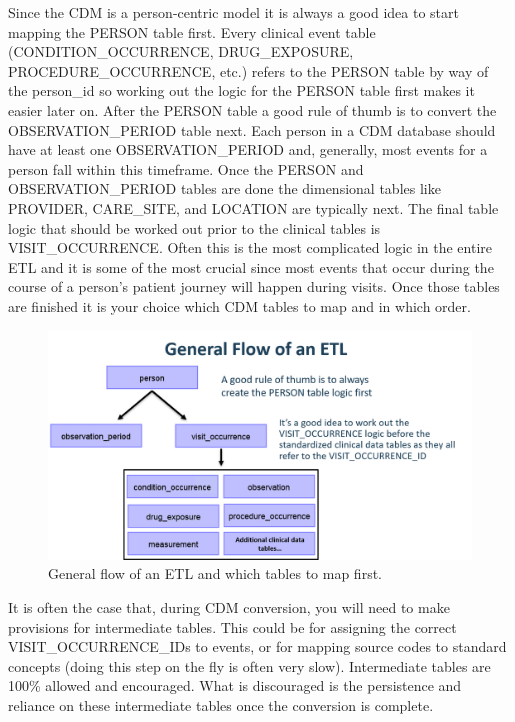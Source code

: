 \documentclass[11pt]{book}
\theoremstyle{definition}
\theoremstyle{definition}
\theoremstyle{definition}
\theoremstyle{remark}
\begin{document}
Since the CDM is a person-centric model it is always a good idea to start mapping the PERSON table first. Every clinical event table (CONDITION\_OCCURRENCE, DRUG\_EXPOSURE, PROCEDURE\_OCCURRENCE, etc.) refers to the PERSON table by way of the person\_id so working out the logic for the PERSON table first makes it easier later on. After the PERSON table a good rule of thumb is to convert the OBSERVATION\_PERIOD table next. Each person in a CDM database should have at least one OBSERVATION\_PERIOD and, generally, most events for a person fall within this timeframe. Once the PERSON and OBSERVATION\_PERIOD tables are done the dimensional tables like PROVIDER, CARE\_SITE, and LOCATION are typically next. The final table logic that should be worked out prior to the clinical tables is VISIT\_OCCURRENCE. Often this is the most complicated logic in the entire ETL and it is some of the most crucial since most events that occur during the course of a person's patient journey will happen during visits. Once those tables are finished it is your choice which CDM tables to map and in which order.

\begin{figure}
\includegraphics[width=1\linewidth]{images/ExtractTransformLoad/flowOfEtl} \caption{General flow of an ETL and which tables to map first.}\label{fig:etlFlow}
\end{figure}

It is often the case that, during CDM conversion, you will need to make provisions for intermediate tables. This could be for assigning the correct VISIT\_OCCURRENCE\_IDs to events, or for mapping source codes to standard concepts (doing this step on the fly is often very slow). Intermediate tables are 100\% allowed and encouraged. What is discouraged is the persistence and reliance on these intermediate tables once the conversion is complete.
\end{document}
